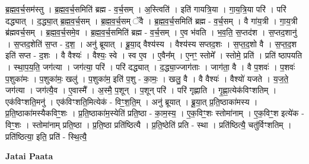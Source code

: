 \documentclass[17pt]{extarticle}
\begin{document}
ब्र॒ह्म॒व॒र्च॒सम॑स्तु । ब्र॒ह्म॒व॒र्च॒समिति॑ ब्रह्म - व॒र्च॒सम् । अ॒स्त्विति॑ । इति॑ गायत्रि॒या । गा॒य॒त्रि॒या परि॑ । परि॑ दद्ध्यात् । द॒द्ध्या॒त् ब्र॒ह्म॒व॒र्च॒सम् । ब्र॒ह्म॒व॒र्च॒सम् ॅवै । ब्र॒ह्म॒व॒र्च॒समिति॑ ब्रह्म - व॒र्च॒सम् । वै गा॑य॒त्री । गा॒य॒त्री ब्र॑ह्मवर्च॒सम् । ब्र॒ह्म॒व॒र्च॒समे॒व । ब्र॒ह्म॒व॒र्च॒समिति॑ ब्रह्म - व॒र्च॒सम् । ए॒व भ॑वति । भ॒व॒ति॒ स॒प्तद॑श । स॒प्तद॒शानु॑ । स॒प्तद॒शेति॑ स॒प्त - द॒श॒ । अनु॑ ब्रूयात् । ब्रू॒या॒द् वैश्य॑स्य । वैश्य॑स्य सप्तद॒शः । स॒प्त॒द॒शो वै । स॒प्त॒द॒श इति॑ सप्त - द॒शः । वै वैश्यः॑ । वैश्यः॒ स्वे । स्व ए॒व । ए॒वैन᳚म् । ए॒नꣳ॒॒ स्तोमे᳚ । स्तोमे॒ प्रति॑ । प्रति॑ ष्ठापयति । स्था॒प॒य॒ति॒ जग॑त्या । जग॑त्या॒ परि॑ । परि॑ दद्ध्यात् । द॒द्ध्या॒ज्जाग॑ताः । जाग॑ता॒ वै । वै प॒शवः॑ । प॒शवः॑ प॒शुका॑मः । प॒शुका॑मः॒ खलु॑ । प॒शुका॑म॒ इति॑ प॒शु - का॒मः॒ । खलु॒ वै । वै वैश्यः॑ । वैश्यो॑ यजते । य॒ज॒ते॒ जग॑त्या । जग॑त्यै॒व । ए॒वास्मै᳚ । अ॒स्मै॒ प॒शून् । प॒शून् परि॑ । परि॑ गृह्णाति । गृ॒ह्णा॒त्येक॑विꣳशतिम् । एक॑विꣳशति॒मनु॑ । एक॑विꣳशति॒मित्येक॑ - विꣳ॒॒श॒ति॒म् । अनु॑ ब्रूयात् । ब्रू॒या॒त् प्र॒ति॒ष्ठाका॑मस्य । प्र॒ति॒ष्ठाका॑मस्यैकविꣳ॒॒शः । प्र॒ति॒ष्ठाका॑म॒स्येति॑ प्रति॒ष्ठा - का॒म॒स्य॒ । ए॒क॒विꣳ॒॒शः स्तोमा॑नाम् । ए॒क॒विꣳ॒॒श इत्ये॑क - विꣳ॒॒शः । स्तोमा॑नाम् प्रति॒ष्ठा । प्र॒ति॒ष्ठा प्रति॑ष्ठित्यै । प्र॒ति॒ष्ठेति॑ प्रति - स्था । प्रति॑ष्ठित्यै॒ चतु॑र्विꣳशतिम् । प्रति॑ष्ठित्या॒ इति॒ प्रति॑ - स्थि॒त्यै॒ \newline

\textbf{Jatai Paata} \newline
\end{document}
